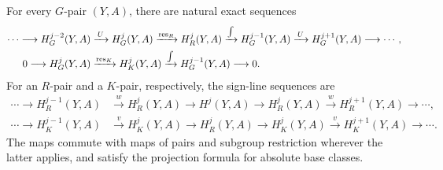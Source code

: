 \begin{proposition}
\label{prop:gysin}
For every \(G\)-pair \((Y,A)\), there are natural exact sequences
\begin{align}
 \cdots\longrightarrow H_G^{j-2}(Y,A)
 &\xrightarrow{\,U\,} H_G^j(Y,A)
 \xrightarrow{\operatorname{res}_R} H_R^j(Y,A)
 \xrightarrow{\int} H_G^{j-1}(Y,A)
 \xrightarrow{\,U\,} H_G^{j+1}(Y,A)\longrightarrow\cdots,
 \label{eqv:standard-gysin}\\
 0\longrightarrow H_G^j(Y,A)
 &\xrightarrow{\operatorname{res}_K}H_K^j(Y,A)
 \xrightarrow{\int}H_G^{j-1}(Y,A)
 \longrightarrow0.
 \label{eqv:weight-two-gysin}
\end{align}
For an \(R\)-pair and a \(K\)-pair, respectively, the sign-line
sequences are
\begin{align}
 \cdots\longrightarrow H_R^{j-1}(Y,A)
 &\xrightarrow{\,w\,}H_R^j(Y,A)
 \longrightarrow H^j(Y,A)
 \longrightarrow H_R^j(Y,A)
 \xrightarrow{\,w\,}H_R^{j+1}(Y,A)\longrightarrow\cdots,
 \label{eqv:reflection-gysin}\\
 \cdots\longrightarrow H_K^{j-1}(Y,A)
 &\xrightarrow{\,v\,}H_K^j(Y,A)
 \longrightarrow H_R^j(Y,A)
 \longrightarrow H_K^j(Y,A)
 \xrightarrow{\,v\,}H_K^{j+1}(Y,A)\longrightarrow\cdots.
 \label{eqv:half-shift-gysin}
\end{align}
The maps commute with maps of pairs and subgroup restriction wherever
the latter applies, and satisfy the projection formula for absolute
base classes.
\end{proposition}

